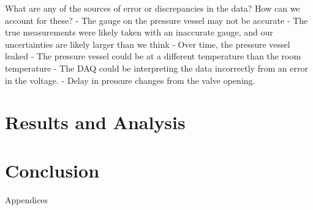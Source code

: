 \documentclass{article}
\begin{document}
What are any of the sources of error or discrepancies in the data? How can we account for these?
- The gauge on the pressure vessel may not be accurate
- The true measurements were likely taken with an inaccurate gauge, and our uncertainties are likely larger than we think
- Over time, the pressure vessel leaked
- The pressure vessel could be at a different temperature than the room temperature
- The DAQ could be interpreting the data incorrectly from an error in the voltage.
- Delay in pressure changes from the valve opening.


\section{Results and Analysis}

\section{Conclusion}

\newpage
\thispagestyle{empty}  %
\begin{center}
	\vspace*{\fill}
	{\Huge Appendices}
	\vspace*{\fill}
\end{center}
\end{document}
